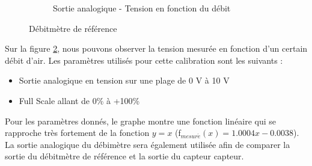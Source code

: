 \begin{itemize}
\begin{figure}[H]
\begin{subfigure}{0.5\textwidth}
                  \caption{Sortie analogique - Tension en fonction du débit}
                  \label{fig:calibration}
              \end{subfigure}
              \caption{Débitmètre de référence}
          \end{figure}
          
          Sur la figure \ref{fig:calibration}, nous pouvons observer la tension mesurée en fonction d'un certain débit d'air. Les paramètres utilisés
          pour cette calibration sont les suivants :
          \begin{itemize}
              \item Sortie analogique en tension sur une plage de 0 V à 10 V
              \item Full Scale allant de 0\% à +100\%
          \end{itemize}
          
          Pour les paramètres donnés, le graphe montre une fonction linéaire qui se rapproche très fortement de la fonction $y = x$ (f$_{mesur\acute{e}}(x) = 1.0004x - 0.0038$).\\
          
          La sortie analogique du débimètre sera également utilisée afin de comparer la sortie du débitmètre de référence et la sortie du capteur 
          \gls{capteur}. \\
          

\end{itemize}
